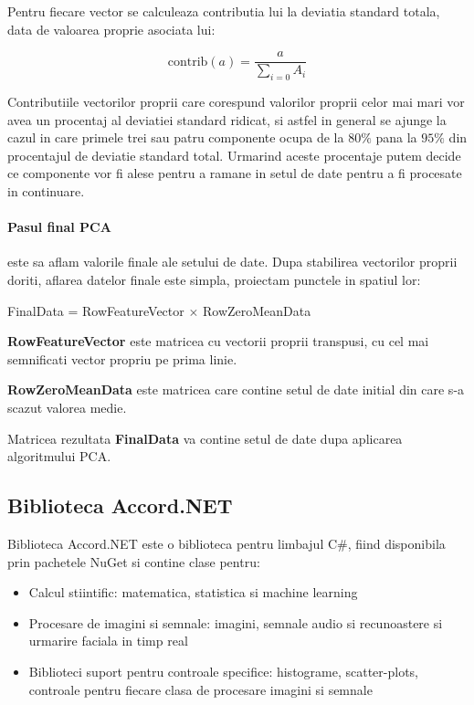 \documentclass[12pt,oneside]{article}
\begin{document}
Pentru fiecare vector se calculeaza contributia lui la deviatia standard totala, data de valoarea proprie asociata lui:

\begin{equation}
	\text{contrib}(a)=\frac{a}{\sum_{i=0} A_i}
\end{equation}

Contributiile vectorilor proprii care corespund valorilor proprii celor mai mari vor avea un procentaj al deviatiei standard ridicat, si astfel in general se ajunge la cazul in care primele trei sau patru componente ocupa de la $80\%$ pana la $95\%$ din procentajul de deviatie standard total. Urmarind aceste procentaje putem decide ce componente vor fi alese pentru a ramane in setul de date pentru a fi procesate in continuare.


\paragraph{Pasul final PCA} este sa aflam valorile finale ale setului de date. Dupa stabilirea vectorilor proprii doriti, aflarea datelor finale este simpla, proiectam punctele in spatiul lor: 

FinalData = RowFeatureVector $\times$ RowZeroMeanData

\textbf{RowFeatureVector} este matricea cu vectorii proprii transpusi, cu cel mai semnificati vector propriu pe prima linie.

\textbf{RowZeroMeanData} este matricea care contine setul de date initial din care s-a scazut valorea medie.

Matricea rezultata \textbf{FinalData} va contine setul de date dupa aplicarea algoritmului PCA.

\subsection{Biblioteca Accord.NET}
Biblioteca Accord.NET este o biblioteca pentru limbajul C\#, fiind disponibila prin pachetele NuGet si contine clase pentru:
\begin{itemize}
\item Calcul stiintific: matematica, statistica si machine learning
\item Procesare de imagini si semnale: imagini, semnale audio si recunoastere si urmarire faciala in timp real
\item Biblioteci suport pentru controale specifice: histograme, scatter-plots, controale pentru fiecare clasa de procesare imagini si semnale
\end{itemize}
\end{document}
